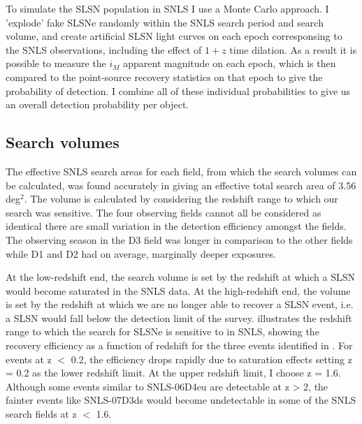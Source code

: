To simulate the SLSN population in SNLS I use a Monte Carlo approach. I 'explode' fake SLSNe randomly within the SNLS search period and search volume, and create artificial SLSN light curves on each epoch corresponsing to the SNLS observations, including the effect of $1+z$ time dilation. As a result it is possible to measure the $i_M$ apparent magnitude on each epoch, which is then compared to the point-source recovery statistics on that epoch to give the probability of detection. I combine all of these individual probabilities to give us an overall detection probability per object.

\subsection{Search volumes}
\label{sec:search-volumes}
The effective SNLS search areas for each field, from which the search volumes can be calculated, was found accurately in \citet{Perrett2012} giving an effective total search area of 3.56\,deg$^2$. The volume is calculated by considering the redshift range to which our search was sensitive. The four observing fields cannot all be considered as identical there are small variation in the detection efficiency amongst the fields. The observing season in the D3 field was longer in comparison to the other fields while D1 and D2 had on average, marginally deeper exposures.

At the low-redshift end, the search volume is set by the redshift at which a SLSN would become saturated in the SNLS data. At the high-redshift end, the volume is set by the redshift at which we are no longer able to recover a SLSN event, i.e. a SLSN would fall below the detection limit of the survey.  illustrates the redshift range to which the search for SLSNe is sensitive to in SNLS, showing the recovery efficiency as a function of redshift for the three events identified in . For events at z $<$ 0.2, the efficiency drops rapidly due to saturation effects setting z = 0.2 as the lower redshift limit. At the upper redshift limit, I choose z = 1.6. Although some events similar to SNLS-06D4eu are detectable at z > 2, the fainter events like SNLS-07D3ds would become undetectable in some of the SNLS search fields at z $<$ 1.6.


